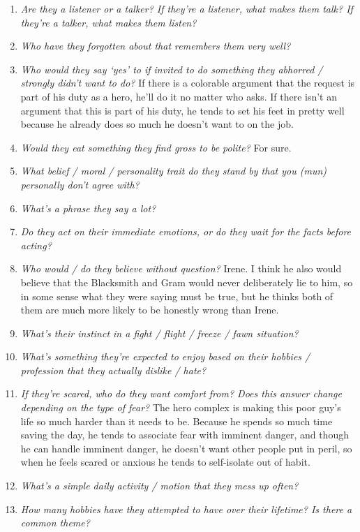 \begin{enumerate}
    \item\textit{Are they a listener or a talker? If they’re a listener, what makes them talk? If they’re a talker, what makes them listen?}
    \item\textit{Who have they forgotten about that remembers them very well?}
    \item\textit{Who would they say ‘yes’ to if invited to do something they abhorred / strongly didn’t want to do?} If there is a colorable argument that the request is part of his duty as a hero, he'll do it no matter who asks. If there isn't an argument that this is part of his duty, he tends to set his feet in pretty well because he already does so much he doesn't want to on the job.
    \item\textit{Would they eat something they find gross to be polite?} For sure.
    \item\textit{What belief / moral / personality trait do they stand by that you (mun) personally don’t agree with?}
    \item\textit{What’s a phrase they say a lot?}
    \item\textit{Do they act on their immediate emotions, or do they wait for the facts before acting?}
    \item\textit{Who would / do they believe without question?} Irene. I think he also would believe that the Blacksmith and Gram would never deliberately lie to him, so in some sense what they were saying must be true, but he thinks both of them are much more likely to be honestly wrong than Irene.
    \item\textit{What’s their instinct in a fight / flight / freeze / fawn situation?} 
    \item\textit{What’s something they’re expected to enjoy based on their hobbies / profession that they actually dislike / hate?}
    \item\textit{If they’re scared, who do they want comfort from? Does this answer change depending on the type of fear?} The hero complex is making this poor guy's life so much harder than it needs to be. Because he spends so much time saving the day, he tends to associate fear with imminent danger, and though he can handle imminent danger, he doesn't want other people put in peril, so when he feels scared or anxious he tends to self-isolate out of habit. 
    \item\textit{What’s a simple daily activity / motion that they mess up often?}
    \item\textit{How many hobbies have they attempted to have over their lifetime? Is there a common theme?}
  \end{enumerate}